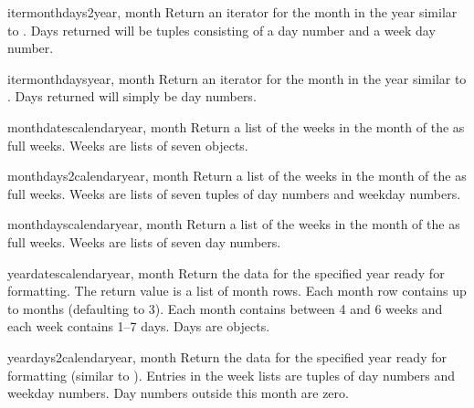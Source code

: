 \begin{methoddesc}{itermonthdays2}{year, month}
Return an iterator for the month  in the year
 similar to . Days returned
will be tuples consisting of a day number and a week day
number.
\end{methoddesc}

\begin{methoddesc}{itermonthdays}{year, month}
Return an iterator for the month  in the year
 similar to . Days returned
will simply be day numbers.
\end{methoddesc}

\begin{methoddesc}{monthdatescalendar}{year, month}
Return a list of the weeks in the month  of
the  as full weeks. Weeks are lists of seven
 objects.
\end{methoddesc}

\begin{methoddesc}{monthdays2calendar}{year, month}
Return a list of the weeks in the month  of
the  as full weeks. Weeks are lists of seven
tuples of day numbers and weekday numbers.
\end{methoddesc}

\begin{methoddesc}{monthdayscalendar}{year, month}
Return a list of the weeks in the month  of
the  as full weeks. Weeks are lists of seven
day numbers.
\end{methoddesc}

\begin{methoddesc}{yeardatescalendar}{year, month}
Return the data for the specified year ready for formatting. The return
value is a list of month rows. Each month row contains up to 
months (defaulting to 3). Each month contains between 4 and 6 weeks and
each week contains 1--7 days. Days are  objects.
\end{methoddesc}

\begin{methoddesc}{yeardays2calendar}{year, month}
Return the data for the specified year ready for formatting (similar to
). Entries in the week lists are tuples of
day numbers and weekday numbers. Day numbers outside this month are zero.
\end{methoddesc}

